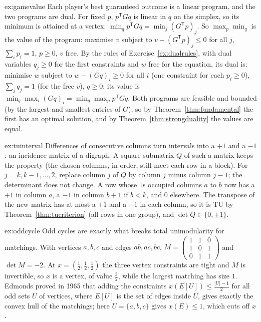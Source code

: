 \begin{solution}{ex:gamevalue}
\idea Each player's best guaranteed outcome is a linear program, and the two programs are dual.
\writeup For fixed $p$, $p^{\mathsf T}Gq$ is linear in $q$ on the simplex, so its minimum is attained at a vertex: $\min_qp^{\mathsf T}Gq=\min_j(G^{\mathsf T}p)_j$. So $\max_p\min_q$ is the value of the program: maximise $v$ subject to $v-(G^{\mathsf T}p)_j\le0$ for all $j$,
$\sum_ip_i=1$, $p\ge0$, $v$ free. By the rules of Exercise~\ref{ex:dualrules}, with dual variables $q_j\ge0$ for the first constraints and $w$ free for the equation, its dual is: minimise $w$ subject to $w-(Gq)_i\ge0$ for all $i$ (one constraint for each $p_i\ge0$),
$\sum_jq_j=1$ (for the free $v$), $q\ge0$; its value is $\min_q\max_i(Gq)_i=\min_q\max_pp^{\mathsf T}Gq$. Both programs are feasible and bounded (by the largest and smallest entries of $G$), so by Theorem~\ref{thm:fundamental} the first has an optimal solution, and by Theorem~\ref{thm:strongduality} the
values are equal.
\end{solution}

\begin{solution}{ex:tuinterval}
\idea Differences of consecutive columns turn intervals into a $+1$ and a $-1$: an incidence matrix of a digraph.
\writeup A square submatrix $Q$ of such a matrix keeps the property (the chosen columns, in order, still meet each row in a block). For $j=k,k-1,\dots,2$, replace column $j$ of $Q$ by column $j$ minus column $j-1$; the determinant does not change. A row whose $1$s
occupied columns $a$ to $b$ now has a $+1$ in column $a$, a $-1$ in column $b+1$ if $b<k$, and $0$ elsewhere. The transpose of the new matrix has at most a $+1$ and a $-1$ in each column, so it is TU by Theorem~\ref{thm:tucriterion} (all rows in one group),
and $\det Q\in\{0,\pm1\}$.
\end{solution}

\begin{solution}{ex:oddcycle}
\idea Odd cycles are exactly what breaks total unimodularity for matchings.
\writeup With vertices $a,b,c$ and edges $ab,ac,bc$, $M=\left(\begin{smallmatrix}1&1&0\\1&0&1\\0&1&1\end{smallmatrix}\right)$ and $\det M=-2$. At $x=(\tfrac12,\tfrac12,\tfrac12)$ the three vertex constraints are tight and $M$ is invertible, so $x$ is a vertex, of value $\tfrac32$,
while the largest matching has size $1$. Edmonds proved in 1965 that adding the constraints $x(E[U])\le\tfrac{|U|-1}2$ for all odd sets $U$ of vertices, where $E[U]$ is the set of edges inside $U$, gives exactly the convex hull of the matchings; here $U=\{a,b,c\}$ gives $x(E)\le1$, which cuts off $x$.
\end{solution}

